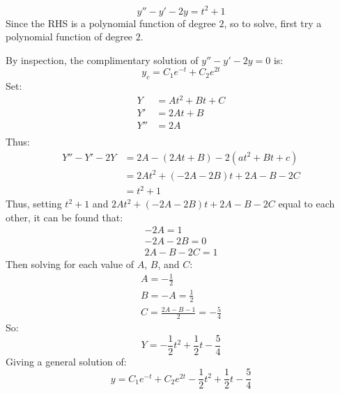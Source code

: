 \documentclass[12pt]{article}
\begin{document}
\begin{example}
  \begin{equation*}
    y'' - y' - 2y = t^2 + 1
  \end{equation*}
  Since the RHS is a polynomial function of degree $2$, so to solve, first try a polynomial function of degree $2$.

  By inspection, the complimentary solution of $y'' - y' - 2y = 0$ is:
  \begin{equation*}
    y_c = C_1e^{-t}+C_2e^{2t}
  \end{equation*}
  Set:
  \begin{align*}
    Y &= At^2 + Bt + C \\
    Y' &= 2At + B \\
    Y'' &= 2A \\
  \end{align*}
  Thus:
  \begin{align*}
    Y'' - Y' - 2Y &= 2A - (2At+B) - 2\left(at^2+Bt+c\right) \\
                  &= 2At^2 + (-2A-2B)t + 2A - B - 2C \\
                  &= t^2 + 1
  \end{align*}
  Thus, setting $t^2 + 1$ and $2At^2 + (-2A-2B)t + 2A - B - 2C$ equal to each other, it can be found that:
  \begin{gather*}
    -2A = 1 \\
    -2A-2B = 0 \\
    2A-B-2C = 1
  \end{gather*}
  Then solving for each value of $A$, $B$, and $C$:
  \begin{gather*}
    A = -\frac{1}{2} \\
    B = -A = \frac{1}{2} \\
    C = \frac{2A-B-1}{2} = -\frac{5}{4}
  \end{gather*}
  So:
  \begin{equation*}
    Y = -\frac{1}{2}t^2 + \frac{1}{2}t - \frac{5}{4}
  \end{equation*}
  Giving a general solution of:
  \begin{equation*}
    y = C_1e^{-t} + C_2e^{2t} - \frac{1}{2}t^2 + \frac{1}{2}t - \frac{5}{4}
  \end{equation*}
\end{example}
\end{document}

